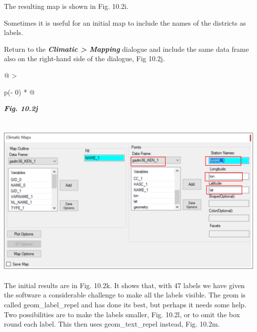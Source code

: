 \documentclass[
  letterpaper,
  DIV=11,
  numbers=noendperiod]{scrreprt}
\begin{document}
The resulting map is shown in Fig. 10.2i.

Sometimes it is useful for an initial map to include the names of the
districts as labels.

Return to the \textbf{\emph{Climatic \textgreater{} Mapping}} dialogue
and include the same data frame also on the right-hand side of the
dialogue, Fig 10.2j.

\begin{longtable}[]{@{}
  >{\raggedright\arraybackslash}p{(\columnwidth - 0\tabcolsep) * }@{}}
\toprule\noalign{}
\begin{minipage}[b]{\linewidth}\raggedright
\textbf{\emph{Fig. 10.2j}}
\end{minipage} \\
\midrule\noalign{}
\endhead
\bottomrule\noalign{}
\endlastfoot
\includegraphics[width=5.43952in,height=2.98794in]{figures/Fig10.2j.png} \\
\end{longtable}

The initial results are in Fig. 10.2k. It shows that, with 47 labels we
have given the software a considerable challenge to make all the labels
visible. The geom is called geom\_label\_repel and has done its best,
but perhaps it needs some help. Two possibilities are to make the labels
smaller, Fig. 10.2l, or to omit the box round each label. This then uses
geom\_text\_repel instead, Fig. 10.2m.
\end{document}
